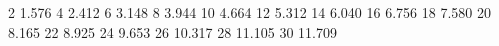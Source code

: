 2	1.576
4	2.412
6	3.148
8	3.944
10	4.664
12	5.312
14	6.040
16	6.756
18	7.580
20	8.165
22	8.925
24	9.653
26	10.317
28	11.105
30	11.709

